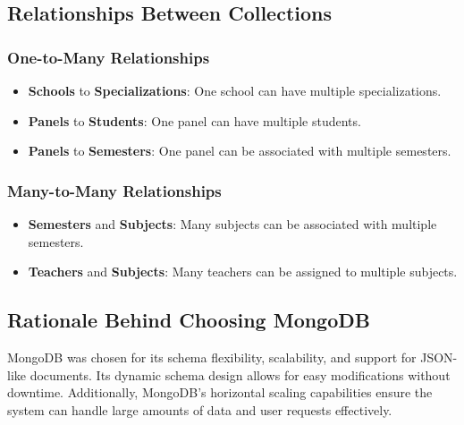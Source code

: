 \documentclass[conference]{IEEEtran}
\begin{document}
\subsection{Relationships Between Collections}
\subsubsection{One-to-Many Relationships}
\begin{itemize}
    \item \textbf{Schools} to \textbf{Specializations}: One school can have multiple specializations.
    \item \textbf{Panels} to \textbf{Students}: One panel can have multiple students.
    \item \textbf{Panels} to \textbf{Semesters}: One panel can be associated with multiple semesters.
\end{itemize}

\subsubsection{Many-to-Many Relationships}
\begin{itemize}
    \item \textbf{Semesters} and \textbf{Subjects}: Many subjects can be associated with multiple semesters.
    \item \textbf{Teachers} and \textbf{Subjects}: Many teachers can be assigned to multiple subjects.
\end{itemize}

\subsection{Rationale Behind Choosing MongoDB}
MongoDB was chosen for its schema flexibility, scalability, and support for JSON-like documents. Its dynamic schema design allows for easy modifications without downtime. Additionally, MongoDB's horizontal scaling capabilities ensure the system can handle large amounts of data and user requests effectively.
\end{document}
